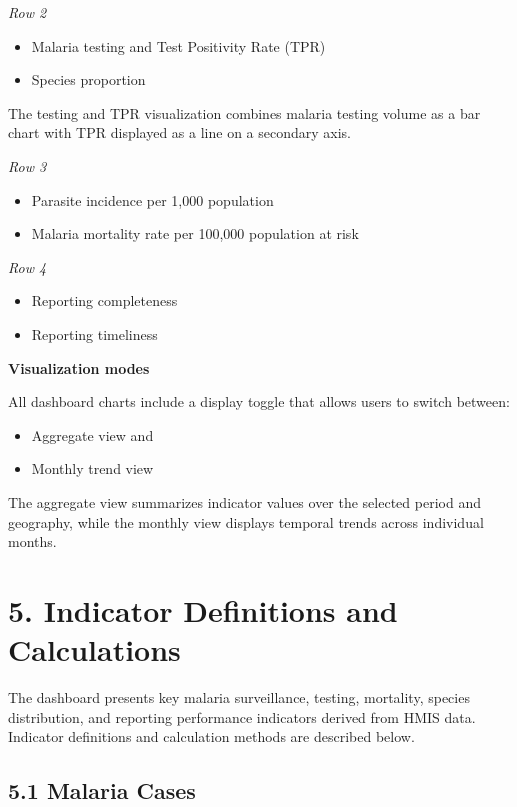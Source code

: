 \documentclass[
  letterpaper,
  DIV=11,
  numbers=noendperiod]{scrartcl}
\providecommand{\tightlist}{%
  \setlength{\itemsep}{0pt}\setlength{\parskip}{0pt}}
\begin{document}
\emph{Row 2}

\begin{itemize}
\tightlist
\item
  Malaria testing and Test Positivity Rate (TPR)
\item
  Species proportion
\end{itemize}

The testing and TPR visualization combines malaria testing volume as a
bar chart with TPR displayed as a line on a secondary axis.

\emph{Row 3}

\begin{itemize}
\tightlist
\item
  Parasite incidence per 1,000 population
\item
  Malaria mortality rate per 100,000 population at risk
\end{itemize}

\emph{Row 4}

\begin{itemize}
\tightlist
\item
  Reporting completeness
\item
  Reporting timeliness
\end{itemize}

\textbf{Visualization modes}

All dashboard charts include a display toggle that allows users to
switch between:

\begin{itemize}
\tightlist
\item
  Aggregate view and
\item
  Monthly trend view
\end{itemize}

The aggregate view summarizes indicator values over the selected period
and geography, while the monthly view displays temporal trends across
individual months.

\section{5. Indicator Definitions and
Calculations}\label{indicator-definitions-and-calculations}

The dashboard presents key malaria surveillance, testing, mortality,
species distribution, and reporting performance indicators derived from
HMIS data. Indicator definitions and calculation methods are described
below.

\subsection{5.1 Malaria Cases}\label{malaria-cases}
\end{document}
